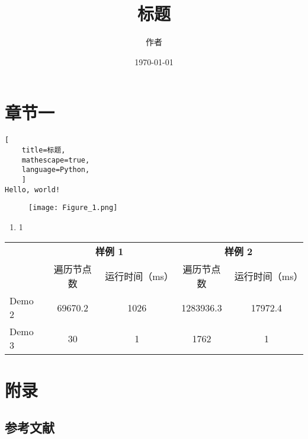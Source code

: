 \documentclass[UTF8]{ctexart}
\title{标题}
\author{作者}
\date{\today}
\begin{document}
\maketitle

\newpage

\tableofcontents

\newpage

\section{章节一}

\begin{lstlisting}[
    title=标题,
    mathescape=true,
    language=Python,
    ]
Hello, world!
\end{lstlisting}

\begin{figure}[H]
    \centering
    \texttt{[image: Figure\_1.png]}
\end{figure}

\begin{enumerate}[
    label = (\arabic*),
    itemindent = 0pt,
    labelindent = \parindent,
    labelwidth = 2em,
    labelsep = 5pt,
    leftmargin = *]
    \item 1
\end{enumerate}

\begin{table}[H]
    \begin{center}
    \begin{tabular}{l|c|c|c|c}
        &\multicolumn{2}{c|}{\textbf{样例 1}}&\multicolumn{2}{c|}{\textbf{样例 2}}\\
        &遍历节点数&运行时间（ms）&遍历节点数&运行时间（ms）\\
        \hline
        Demo 2&69670.2&1026&1283936.3&17972.4\\
        Demo 3&30&1&1762&1\\
    \end{tabular}
\end{center}
\end{table}

\newpage

\appendix

\section{附录}

\subsection{参考文献}

\printbibliography[heading=none]
\end{document}
